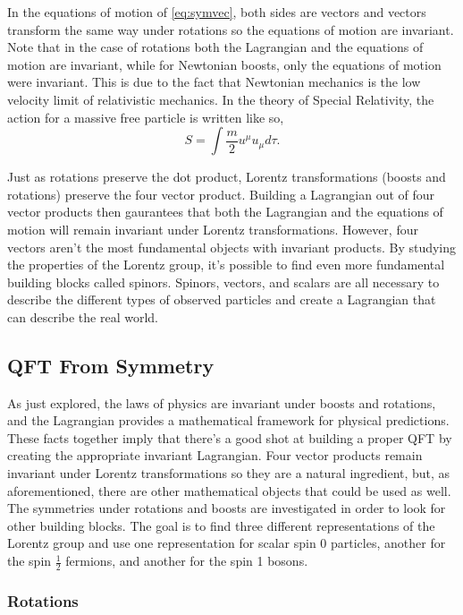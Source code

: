 \documentclass[12pt]{article}
\begin{document}
In the equations of motion of \ref{eq:symvec}, both sides are vectors and vectors transform the same way under rotations so the equations of motion are invariant. Note that in the case of rotations both the Lagrangian and the equations of motion are invariant, while for Newtonian boosts, only the equations of motion were invariant. This is due to the fact that Newtonian mechanics is the low velocity limit of relativistic mechanics. In the theory of Special Relativity, the action for a massive free particle is written like so,
\begin{equation}
S = \int \frac{m}{2}u^{\mu}u_{\mu}d\tau.
\end{equation}

Just as rotations preserve the dot product, Lorentz transformations (boosts and rotations) preserve the four vector product. Building a Lagrangian out of four vector products then gaurantees that both the Lagrangian and the equations of motion will remain invariant under Lorentz transformations. However, four vectors aren't the most fundamental objects with invariant products. By studying the properties of the Lorentz group, it's possible to find even more fundamental building blocks called spinors. Spinors, vectors, and scalars are all necessary to describe the different types of observed particles and create a Lagrangian that can describe the real world. 

\subsection{QFT From Symmetry}

As just explored, the laws of physics are invariant under boosts and rotations, and the Lagrangian provides a mathematical framework for physical predictions. These facts together imply that there's a good shot at building a proper QFT by creating the appropriate invariant Lagrangian. Four vector products remain invariant under Lorentz transformations so they are a natural ingredient, but, as aforementioned, there are other mathematical objects that could be used as well. The symmetries under rotations and boosts are investigated in order to look for other building blocks. The goal is to find three different representations of the Lorentz group and use one representation for scalar spin 0 particles, another for the spin $\frac{1}{2}$ fermions, and another for the spin 1 bosons.

\subsubsection{Rotations}
\end{document}

